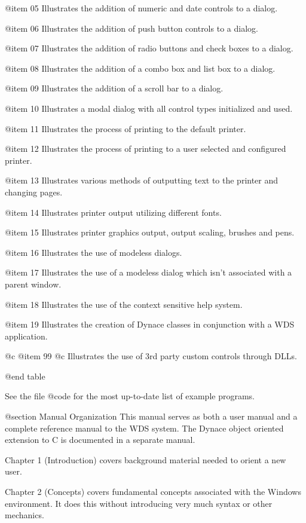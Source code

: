 @item 05
Illustrates the addition of numeric and date controls to a dialog.

@item 06
Illustrates the addition of push button controls to a dialog.

@item 07
Illustrates the addition of radio buttons and check boxes to a dialog.

@item 08
Illustrates the addition of a combo box and list box to a dialog.

@item 09
Illustrates the addition of a scroll bar to a dialog.

@item 10
Illustrates a modal dialog with all control types initialized and used.

@item 11
Illustrates the process of printing to the default printer.

@item 12
Illustrates the process of printing to a user selected and configured printer.

@item 13
Illustrates various methods of outputting text to the printer and
changing pages.

@item 14
Illustrates printer output utilizing different fonts.

@item 15
Illustrates printer graphics output, output scaling, brushes and pens.

@item 16
Illustrates the use of modeless dialogs.

@item 17
Illustrates the use of a modeless dialog which isn't associated with a parent
window.

@item 18
Illustrates the use of the context sensitive help system.

@item 19
Illustrates the creation of Dynace classes in conjunction with a WDS
application.

@c @item 99
@c Illustrates the use of 3rd party custom controls through DLLs.

@end table

See the file @code{\DYNACE\WINEXAM\LIST} for the most up-to-date list
of example programs.


@section Manual Organization
This manual serves as both a user manual and a complete reference manual
to the WDS  system.  The Dynace object oriented extension to C is documented
in a separate manual. 

Chapter 1 (Introduction) covers background material needed to orient
a new user.

Chapter 2 (Concepts) covers fundamental concepts associated with the
Windows environment.  It does this without introducing very much syntax
or other mechanics.

